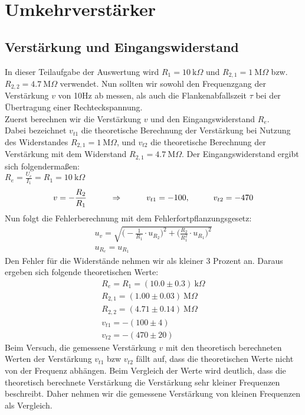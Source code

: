 

\section{Umkehrverstärker}


\subsection*{Verstärkung und Eingangswiderstand}
In dieser Teilaufgabe der Auswertung wird $R_1=10~\text{k}\Omega$ und $R_{2,1}=1~\text{M}\Omega$ bzw. $R_{2,2}=4.7~\text{M}\Omega$ verwendet. Nun sollten wir sowohl den Frequenzgang der Verstärkung $v$ von 10Hz ab messen, als auch die Flankenabfallszeit $\tau$ bei der Übertragung einer Rechteckspannung.\\
Zuerst berechnen wir die Verstärkung $v$ und den Eingangswiderstand $R_e$. \\
Dabei bezeichnet $v_{t1}$ die theoretische Berechnung der Verstärkung bei Nutzung des Widerstandes $R_{2,1}=1~\text{M}\Omega$, und $v_{t2}$ die theoretische Berechnung der Verstärkung mit dem Widerstand $R_{2,1}=4.7~\text{M}\Omega$. Der Eingangswiderstand ergibt sich folgendermaßen: \\
$R_e=\frac{U_e}{I_1}=R_1=10~\text{k}\Omega$
\begin{equation}
    v=-\frac{R_2}{R_1} \tab \Rightarrow \tab v_{t1}= -100, \tab v_{t2}=-470
\end{equation}
Nun folgt die Fehlerberechnung mit dem Fehlerfortpflanzungsgesetz:
\begin{gather}
    u_{v}=\sqrt{\bigl(-\frac{1}{R_1}\cdot u_{R_2}\bigr)^2 + {\bigl(\frac{R_2}{R_1^2}\cdot u_{R_1}\bigr)^2}}\\
    u_{R_e}=u_{R_1}
\end{gather}
Den Fehler für die Widerstände nehmen wir als kleiner 3 Prozent an. Daraus ergeben sich folgende theoretischen Werte:
\begin{gather}
\boxed{R_e=R_1=(10.0\pm 0.3)~\text{k}\Omega}\\
R_{2,1}=(1.00\pm 0.03)~\text{M}\Omega\\
R_{2,2}=(4.71\pm 0.14)~\text{M}\Omega\\
v_{t1}=-(100\pm4)\\
v_{t2}=-(470\pm20)
\end{gather}
Beim Versuch, die gemessene Verstärkung $v$ mit den theoretisch berechneten Werten der Verstärkung  $v_{t1}$ bzw $v_{t2}$ fällt auf, dass die theoretischen Werte nicht von der Frequenz abhängen. Beim Vergleich der Werte wird deutlich, dass die theoretisch berechnete Verstärkung die Verstärkung sehr kleiner Frequenzen beschreibt. Daher nehmen wir die gemessene Verstärkung von kleinen Frequenzen als Vergleich. 
